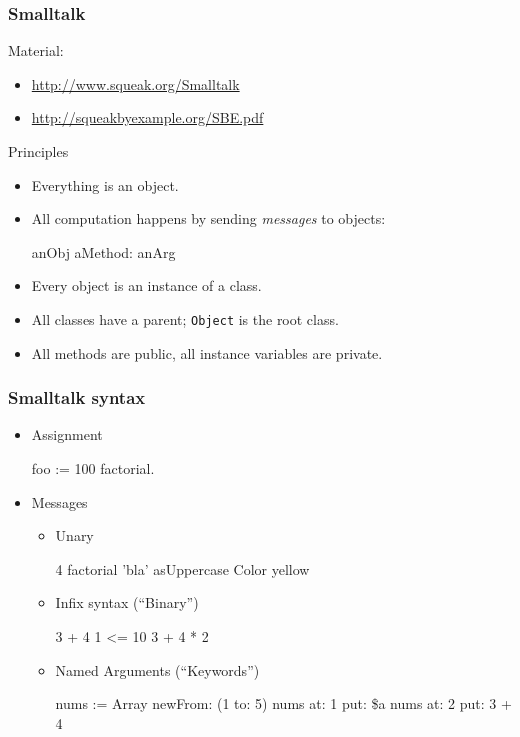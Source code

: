 \documentclass{beamer}
\begin{document}
\begin{frame}[fragile]
\frametitle{Smalltalk}
Material:
\begin{itemize}
  \item \url{http://www.squeak.org/Smalltalk}
  \item \url{http://squeakbyexample.org/SBE.pdf}
\end{itemize}

Principles
\begin{itemize}
\item Everything is an object.
\item All computation happens by sending \textit{messages} to objects:
\begin{cplus3}
      anObj aMethod: anArg
\end{cplus3}
\item Every object is an instance of a class.
\item All classes have a parent; \texttt{Object} is the root class.
\item All methods are public, all instance variables are private.
\end{itemize}


\end{frame}

\begin{frame}[fragile]
\frametitle{Smalltalk syntax}
\begin{itemize}
\item Assignment
\begin{cplus3}
foo := 100 factorial.
\end{cplus3}

\item Messages
\begin{itemize}
\item Unary
\begin{cplus3}
4 factorial
'bla' asUppercase
Color yellow
\end{cplus3}

\item Infix syntax (``Binary'')
\begin{cplus3}
3 + 4
1 <= 10
3 + 4 * 2
\end{cplus3}

\item Named Arguments (``Keywords'')
\begin{cplus3}
nums := Array newFrom: (1 to: 5)
nums at: 1 put: \$a
nums at: 2 put: 3 + 4
\end{cplus3}
\end{itemize}
\end{itemize}
\end{frame}
\end{document}
